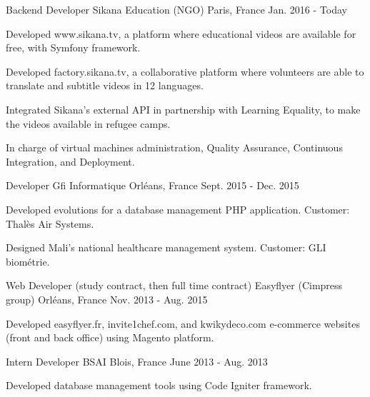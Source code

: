 \begin{cventries}
  \cventry
    {Backend Developer}
    {Sikana Education (NGO)}
    {Paris, France}
    {Jan. 2016 - Today}
    {
      \begin{cvitems}
        \item {Developed www.sikana.tv, a platform where educational videos are available for free, with Symfony framework.}
        \item {Developed factory.sikana.tv, a collaborative platform where volunteers are able to translate and subtitle videos in 12 languages.}
        \item {Integrated Sikana's external API in partnership with Learning Equality, to make the videos available in refugee camps.}
        \item {In charge of virtual machines administration, Quality Assurance, Continuous Integration, and Deployment.}
      \end{cvitems}
    }
  \cventry
    {Developer}
    {Gfi Informatique}
    {Orléans, France}
    {Sept. 2015 - Dec. 2015}
    {
      \begin{cvitems}
        \item {Developed evolutions for a database management PHP application. Customer: Thalès Air Systems.}
        \item {Designed Mali's national healthcare management system. Customer: GLI biométrie.}
      \end{cvitems}
    }
  \cventry
    {Web Developer (study contract, then full time contract)}
    {Easyflyer (Cimpress group)}
    {Orléans, France}
    {Nov. 2013 - Aug. 2015}
    {
      \begin{cvitems}
        \item {Developed easyflyer.fr, invite1chef.com, and kwikydeco.com e-commerce websites (front and back office) using Magento platform.}
      \end{cvitems}
    }
  \cventry
    {Intern Developer}
    {BSAI}
    {Blois, France}
    {June 2013 - Aug. 2013}
    {
      \begin{cvitems}
        \item {Developed database management tools using Code Igniter framework.}
      \end{cvitems}
    }
\end{cventries}
